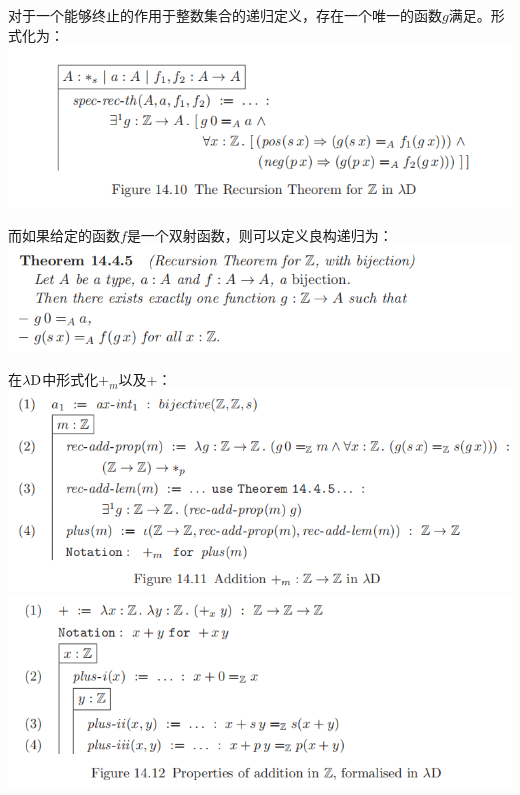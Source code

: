 \documentclass[UTF8]{article}
\begin{document}
		对于一个能够终止的作用于整数集合的递归定义，存在一个唯一的函数$g$满足。形式化为：\\
		\includegraphics[width=0.93\linewidth]{"../imgs/14-8.png"}
		
		而如果给定的函数$f$是一个双射函数，则可以定义良构递归为：\\
		\includegraphics[width=0.93\linewidth]{"../imgs/14-9.png"}
		
		在$\lambda{\rm D}$中形式化$+_m$以及$+$：\\
		\includegraphics[width=0.93\linewidth]{"../imgs/14-10.png"}\\
		\includegraphics[width=0.93\linewidth]{"../imgs/14-11.png"}
\end{document}
